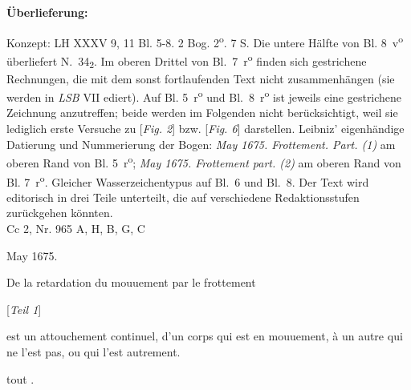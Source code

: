 \begin{ledgroupsized}[r]{120mm}
\footnotesize
\pstart
\noindent\textbf{\"{U}berlieferung:}
\pend
\end{ledgroupsized}
\begin{ledgroupsized}[r]{114mm}
\footnotesize
\pstart
\parindent -6mm
Konzept: LH XXXV 9, 11 Bl. 5-8. 2 Bog. 2\textsuperscript{o}. 7  S. Die untere H\"{a}lfte von Bl. 8~v\textsuperscript{o} überliefert N.~34\textsubscript{2}.
Im oberen Drittel von Bl.~7~r\textsuperscript{o} finden sich gestrichene Rechnungen,
die mit dem sonst fortlaufenden Text nicht zusammenh\"{a}ngen (sie werden in \textit{LSB} VII ediert).
Auf Bl. 5~r\textsuperscript{o} und Bl.~8~r\textsuperscript{o} ist jeweils eine gestrichene Zeichnung anzutreffen;
beide werden im Folgenden nicht ber\"{u}cksichtigt, weil sie lediglich erste Versuche zu [\textit{Fig. 2}] bzw. [\textit{Fig. 6}] darstellen.
Leibniz' eigenh\"{a}ndige Datierung und Nummerierung der Bogen:
\textit{May 1675. Frottement. Part. (1)} am oberen Rand von Bl. 5~r\textsuperscript{o};
\textit{May 1675. Frottement part. (2)} am oberen Rand von Bl. 7~r\textsuperscript{o}.
Gleicher Wasserzeichentypus auf Bl.~6 und Bl.~8.
Der Text wird editorisch in drei Teile unterteilt, die auf verschiedene Redaktionsstufen zur\"{u}ckgehen k\"{o}nnten.%
\\Cc 2, Nr. 965 A, H, B, G, C
\pend
\end{ledgroupsized}
\newpage
\pstart
\noindent
[5~r\textsuperscript{o}] May 1675.
\pend
\pstart
\begin{center}
De la retardation du mouuement par le frottement
\end{center}
\pend
\pstart
\begin{center} [\textit{Teil 1}]
\end{center}
\pend
\count{}
\count{}
\count{}
\pstart
{}
\pend
\begin{Geometrico}
est un attouchement continuel, d'un corps qui est en mouuement, \`{a} un autre qui ne l'est pas, ou qui l'est autrement.
\end{Geometrico}
\begin{Geometrico}
 tout
.
\end{Geometrico}
